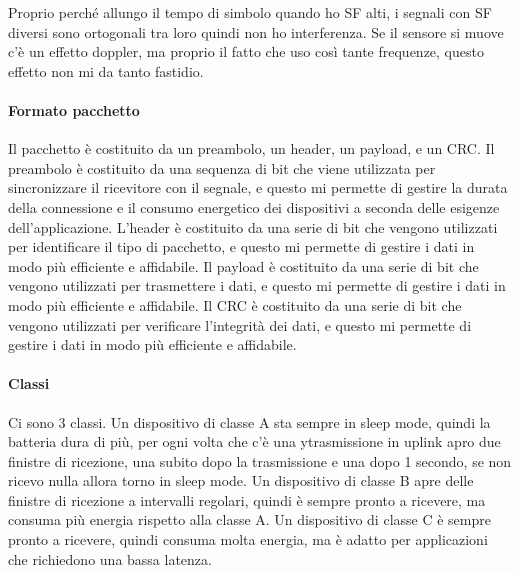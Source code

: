 Proprio perché allungo il tempo di simbolo quando ho SF alti, i segnali con SF diversi sono ortogonali tra loro quindi non ho interferenza. Se il sensore si muove c'è un effetto doppler, ma proprio il fatto che uso così tante frequenze, questo effetto non mi da tanto fastidio.\\
\paragraph{Formato pacchetto}
Il pacchetto è costituito da un preambolo, un header, un payload, e un CRC. Il preambolo è costituito da una sequenza di bit che viene utilizzata per sincronizzare il ricevitore con il segnale, e questo mi permette di gestire la durata della connessione e il consumo energetico dei dispositivi a seconda delle esigenze dell'applicazione. L'header è costituito da una serie di bit che vengono utilizzati per identificare il tipo di pacchetto, e questo mi permette di gestire i dati in modo più efficiente e affidabile. Il payload è costituito da una serie di bit che vengono utilizzati per trasmettere i dati, e questo mi permette di gestire i dati in modo più efficiente e affidabile. Il CRC è costituito da una serie di bit che vengono utilizzati per verificare l'integrità dei dati, e questo mi permette di gestire i dati in modo più efficiente e affidabile.\\
\paragraph{Classi}
Ci sono 3 classi. Un dispositivo di classe A sta sempre in sleep mode, quindi la batteria dura di più, per ogni volta che c'è una ytrasmissione in uplink apro due finistre di ricezione, una subito dopo la trasmissione e una dopo 1 secondo, se non ricevo nulla allora torno in sleep mode. Un dispositivo di classe B apre delle finistre di ricezione a intervalli regolari, quindi è sempre pronto a ricevere, ma consuma più energia rispetto alla classe A. Un dispositivo di classe C è sempre pronto a ricevere, quindi consuma molta energia, ma è adatto per applicazioni che richiedono una bassa latenza.\\

